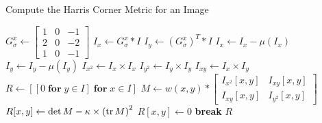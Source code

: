 \begin{answer}
  \begin{algorithm}[H]
    \caption{Compute the Harris Corner Metric for an Image}\label{alg:harris-metric}
    \begin{algorithmic}
        \State
        \State $G_\sigma^x \gets \begin{bmatrix} 1 & 0 & -1 \\ 2 & 0 & -2 \\ 1 & 0 & -1 \end{bmatrix}$ 
        \State
        \State $I_x \gets G_\sigma^x \ast I$
        \State $I_y \gets {(G_\sigma^x)}^T \ast I$
        \State $I_x \gets I_x - \mu(I_x)$ 
        \State $I_y \gets I_y - \mu(I_y)$ 
        \State $I_{x^2} \gets I_x \times I_x$
        \State $I_{y^2} \gets I_y \times I_y$
        \State $I_{xy} \gets I_x \times I_y$
        \State $R \gets [[0\; \mathbf{for}\;  y \in I]\; \mathbf{for}\; x \in I]$ 
            \State
            \State $M \gets w(x, y) \ast \begin{bmatrix} I_{x^2}[x,y] & I_{xy}[x,y] \\ I_{xy}[x,y] & I_{y^2}[x,y] \end{bmatrix}$ 
            \State
            \State $R[x,y] \gets \det M - \kappa \times {(\operatorname{tr}M)}^2$ 
          \EndFor
        \EndFor
                \State $R[x,y] \gets 0$ 
                \State \textbf{break}
              \EndIf
            \EndFor
          \EndFor
        \EndFor
        \State \Return $R$
      \EndProcedure
    \end{algorithmic}
  \end{algorithm}
\end{answer}
